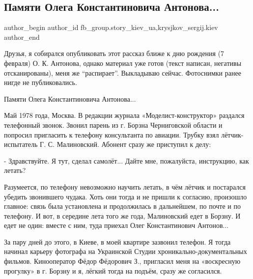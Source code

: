  
 
 
 
 
 
\subsection{Памяти Олега Константиновича Антонова...}
\label{sec:09_01_2022.fb.fb_group.story_kiev_ua.1.pamjati_ok_antonova}
 
\ifcmt
 author_begin
   author_id fb_group.story_kiev_ua,krysjkov_sergij.kiev
 author_end
\fi

Друзья, я собирался опубликовать этот рассказ ближе к дню рождения (7 февраля)
О. К. Антонова, однако материал уже готов (текст написан, негативы
отсканированы),  меня же \enquote{распирает}. Выкладываю сейчас. Фотоснимки ранее нигде
не публиковались.

Памяти Олега Константиновича Антонова...

Май 1978 года, Москва. В редакции журнала «Моделист-конструктор» раздался
телефонный звонок. Звонил парень из г. Борзна Черниговской области и попросил
пригласить к телефону консультанта по авиации. Трубку взял лётчик-испытатель
Г. С. Малиновский. Абонент сразу же приступил к делу:

- Здравствуйте. Я тут, сделал самолёт... Дайте мне, пожалуйста, инструкцию, как
летать?

Разумеется, по телефону невозможно научить летать, в чём лётчик и постарался
убедить звонившего чудака. Хоть они тогда и не пришли к согласию, произошло
главное: связь была установлена и продолжилась в дальнейшем, по почте и по
телефону. И вот, в середине лета того же года, Малиновский едет в Борзну. И
едет не один: вместе с ним, туда приехал Олег Константинович Антонов...


За пару дней до этого, в Киеве, в моей квартире зазвонил телефон. Я тогда
начинал карьеру фотографа на Украинской Студии хроникально-документальных
фильмов. Кинооператор Фёдор Фёдорович З., пригласил меня на «воскресную
прогулку» в г. Борзну и я, лёгкий тогда на подъём, сразу же согласился. 

